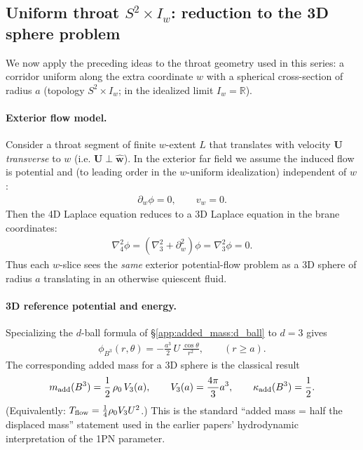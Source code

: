 \documentclass[11pt]{article}
\begin{document}
\subsection{Uniform throat $S^2\times I_w$: reduction to the 3D sphere problem}
\label{app:added_mass:throat}
We now apply the preceding ideas to the throat geometry used in this series:
a corridor uniform along the extra coordinate $w$ with a spherical cross-section
of radius $a$ (topology $S^2\times I_w$; in the idealized limit $I_w=\mathbb R$).

\paragraph{Exterior flow model.}
Consider a throat segment of finite $w$-extent $L$ that translates with velocity
$\mathbf U$ \emph{transverse} to $w$ (i.e. $\mathbf U\perp \hat{\mathbf w}$).
In the exterior far field we assume the induced flow is potential and (to leading
order in the $w$-uniform idealization) independent of $w$:
\begin{align}
\partial_w \phi = 0,
\qquad
v_w=0.
\end{align}
Then the 4D Laplace equation reduces to a 3D Laplace equation in the brane
coordinates:
\begin{align}
\nabla_4^2 \phi
=
(\nabla_3^2 + \partial_w^2)\phi
=
\nabla_3^2 \phi
=
0.
\end{align}
Thus each $w$-slice sees the \emph{same} exterior potential-flow problem as a
3D sphere of radius $a$ translating in an otherwise quiescent fluid.

\paragraph{3D reference potential and energy.}
Specializing the $d$-ball formula of \S\ref{app:added_mass:d_ball} to $d=3$ gives
\begin{align}
\phi_{B^3}(r,\theta)
=
-\frac{a^{3}}{2}\,U\,\frac{\cos\theta}{r^{2}},
\qquad
(r\ge a).
\end{align}
The corresponding added mass for a 3D sphere is the classical result
\begin{align}
m_{\rm add}(B^3)
=
\frac{1}{2}\,\rho_0\,V_3(a),
\qquad
V_3(a)=\frac{4\pi}{3}a^3,
\qquad
\kappa_{\rm add}(B^3)=\frac{1}{2}.
\end{align}
(Equivalently: $T_{\rm flow}=\tfrac{1}{4}\rho_0 V_3 U^2$.)  This is the standard
``added mass = half the displaced mass'' statement used in the earlier papers’
hydrodynamic interpretation of the 1PN parameter.
\end{document}
